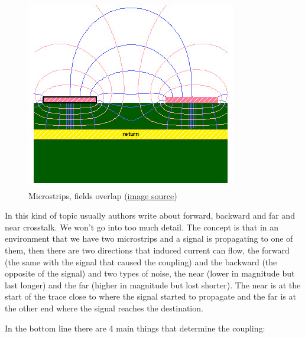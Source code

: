 \documentclass[final]{cubedoc}
\begin{document}
	\begin{figure}[h!]
		\centering
		\includegraphics[keepaspectratio, height=.3\textheight, width = \textwidth]{assets/fringe_fields.png}
		\caption{Microstrips, fields overlap \small{(\href{https://web.archive.org/web/20200814095254/https://www.signalintegrityjournal.com/blogs/4-eric-bogatin-signal-integrity-journal-technical-editor/post/402-pop-quiz-use-tight-or-loosely-coupled-differential-pairs-to-reduce-cross-talk}{image source})}}
	\end{figure}
	
	In this kind of topic usually authors write about forward, backward and far and near crosstalk. We won't go into too much detail. The concept is that in an environment that we have two microstrips and a signal is propagating to one of them, then there are two directions that induced current can flow, the forward (the same with the signal that caused the coupling) and the backward (the opposite of the signal) and two types of noise, the near (lower in magnitude but last longer) and the far (higher in magnitude but lost shorter). The near is at the start of the trace close to where the signal started to propagate  and the far is at the other end where the signal reaches the destination.
	
	
	In the bottom line there are 4 main things that determine the coupling:
	
\end{document}
